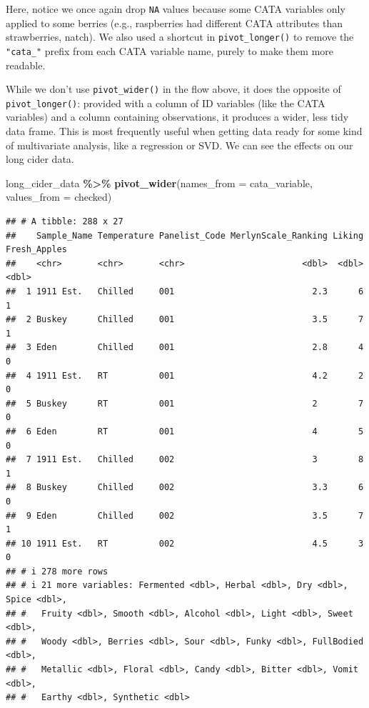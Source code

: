 \documentclass[
]{book}
\newenvironment{Shaded}{\begin{snugshade}}{\end{snugshade}}
\newcommand{\AttributeTok}[1]{\textcolor[rgb]{0.13,0.29,0.53}{#1}}
\newcommand{\FunctionTok}[1]{\textcolor[rgb]{0.13,0.29,0.53}{\textbf{#1}}}
\newcommand{\NormalTok}[1]{#1}
\newcommand{\SpecialCharTok}[1]{\textcolor[rgb]{0.81,0.36,0.00}{\textbf{#1}}}
\begin{document}
Here, notice we once again drop \texttt{NA} values because some CATA variables only applied to some berries (e.g., raspberries had different CATA attributes than strawberries, natch). We also used a shortcut in \texttt{pivot\_longer()} to remove the \texttt{"cata\_"} prefix from each CATA variable name, purely to make them more readable.

While we don't use \texttt{pivot\_wider()} in the flow above, it does the opposite of \texttt{pivot\_longer()}: provided with a column of ID variables (like the CATA variables) and a column containing observations, it produces a wider, less tidy data frame. This is most frequently useful when getting data ready for some kind of multivariate analysis, like a regression or SVD. We can see the effects on our long cider data.

\begin{Shaded}
\begin{Highlighting}[]
\NormalTok{long\_cider\_data }\SpecialCharTok{\%\textgreater{}\%}
  \FunctionTok{pivot\_wider}\NormalTok{(}\AttributeTok{names\_from =}\NormalTok{ cata\_variable,}
              \AttributeTok{values\_from =}\NormalTok{ checked)}
\end{Highlighting}
\end{Shaded}

\begin{verbatim}
## # A tibble: 288 x 27
##    Sample_Name Temperature Panelist_Code MerlynScale_Ranking Liking Fresh_Apples
##    <chr>       <chr>       <chr>                       <dbl>  <dbl>        <dbl>
##  1 1911 Est.   Chilled     001                           2.3      6            1
##  2 Buskey      Chilled     001                           3.5      7            1
##  3 Eden        Chilled     001                           2.8      4            0
##  4 1911 Est.   RT          001                           4.2      2            0
##  5 Buskey      RT          001                           2        7            0
##  6 Eden        RT          001                           4        5            0
##  7 1911 Est.   Chilled     002                           3        8            1
##  8 Buskey      Chilled     002                           3.3      6            0
##  9 Eden        Chilled     002                           3.5      7            1
## 10 1911 Est.   RT          002                           4.5      3            0
## # i 278 more rows
## # i 21 more variables: Fermented <dbl>, Herbal <dbl>, Dry <dbl>, Spice <dbl>,
## #   Fruity <dbl>, Smooth <dbl>, Alcohol <dbl>, Light <dbl>, Sweet <dbl>,
## #   Woody <dbl>, Berries <dbl>, Sour <dbl>, Funky <dbl>, FullBodied <dbl>,
## #   Metallic <dbl>, Floral <dbl>, Candy <dbl>, Bitter <dbl>, Vomit <dbl>,
## #   Earthy <dbl>, Synthetic <dbl>
\end{verbatim}
\end{document}
